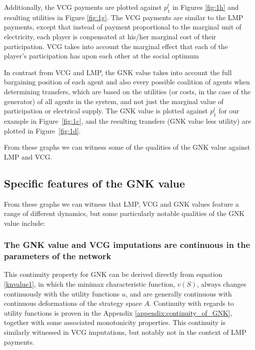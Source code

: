 Additionally, the VCG payments are plotted against $p_1^l$ in Figures \ref{fig:1h} and resulting utilities in Figure \ref{fig:1g}.
The VCG payments are similar to the LMP payments, except that instead of payment proportional to the marginal unit of electricity, each player is conpensated at his/her marginal cost of their participation.
VCG takes into account the marginal effect that each of the player's participation has apon each other at the social optimum

In contrast from VCG and LMP, the GNK value takes into account the full bargaining position of each agent and also every possible coalition of agents when determining transfers, which are based on the utilities (or costs, in the case of the generator) of all agents in the system, and not just the marginal value of participation or electrical supply.
The GNK value is plotted against $p_1^l$ for our example in Figure~\ref{fig:1c}, and the resulting transfers (GNK value less utility) are plotted in Figure~\ref{fig:1d}.

From these graphs we can witness some of the qualities of the GNK value against LMP and VCG.

\subsection{Specific features of the GNK value}

From these graphs we can witness that LMP, VCG and GNK values feature a range of different dynamics,
but some particularly notable qualities of the GNK value include:


\subsubsection*{The GNK value and VCG imputations are continuous in the parameters of the network}
This continuity property for GNK can be derived directly from equation \ref{knvalue1}, in which the minimax characteristic function, $v(S)$,
always changes continuously with the utility functions $u$, and are generally continuous with continuous deformations of the strategy space $A$.
Continuity with regards to utility functions is proven in the Appendix \ref{appendix:continuity_of_GNK}, together with some associated monotonicity properties.
This continuity is similarly witnessed in VCG imputations, but notably not in the context of LMP payments.

